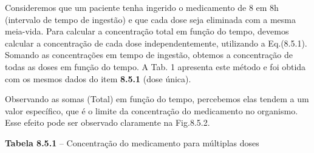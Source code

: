 \documentclass[12pt]{article}
\begin{document}
\begin{enumerate}
\begin{justify}
Consideremos que um paciente tenha ingerido o medicamento de 8 em 8h (intervalo de tempo de ingestão) e que cada dose seja eliminada com a mesma meia-vida. Para calcular a concentração total em função do tempo, devemos calcular a concentração de cada dose independentemente, utilizando a Eq.(8.5.1). Somando as concentrações em tempo de ingestão, obtemos a concentração de todas as doses em função do tempo. A Tab. 1 apresenta este método e foi obtida com os mesmos dados do item \textbf{8.5.1} (dose única). 
\end{justify}\par

\begin{justify}
Observando as somas (Total) em função do tempo, percebemos elas tendem a um valor específico, que é o limite da concentração do medicamento no organismo. Esse efeito pode ser observado claramente na Fig.8.5.2.
\end{justify}\par


\vspace{\baselineskip}
\begin{justify}
\textbf{Tabela 8.5.1} – Concentração do medicamento para múltiplas doses
\end{justify}\par






\end{enumerate}
\end{document}

